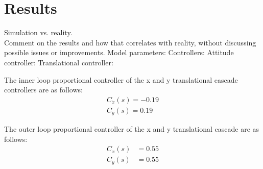 \section{Results}
Simulation vs. reality. \\
Comment on the results and how that correlates with reality, without discussing possible issues or improvements.
Model parameters: 
Controllers:
Attitude controller:
Translational controller:

The inner loop proportional controller of the x and y translational cascade controllers are as follows:
\begin{align}
C_{\dot{x}}(s)= -0.19\\
C_{\dot{y}}(s)= 0.19
\end{align}

The outer loop  proportional controller of the x and y translational cascade are as follows:
\begin{align}
C_x(s)&= 0.55\\
C_y(s)&= 0.55
\end{align}
